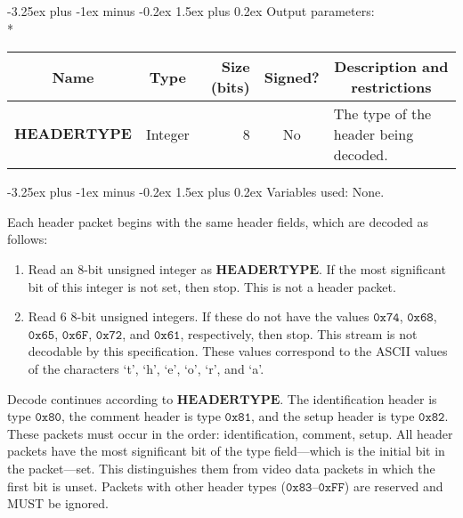 \documentclass[9pt,letterpaper]{book}
\makeatletter
\newcommand{\bitvar}[1]{\ensuremath{\mathbf{\bm{#1}}}}
\newcommand{\hex}[1]{\ensuremath{\mathtt{0x#1}}}
\numberwithin{equation}{chapter}
\numberwithin{figure}{chapter}
\numberwithin{table}{chapter}
\renewcommand{\paragraph}{\@startsection{paragraph}{4}{0ex}%
 {-3.25ex plus -1ex minus -0.2ex}%
 {1.5ex plus 0.2ex}%
 {\normalfont\normalsize\bfseries}}
\makeatother
\begin{document}
\paragraph{Output parameters:}\hfill\\*
\begin{tabularx}{\textwidth}{@{}llrcX@{}}\toprule
\multicolumn{1}{c}{Name} &
\multicolumn{1}{c}{Type} &
\multicolumn{1}{p{30pt}}{\centering Size (bits)} &
\multicolumn{1}{c}{Signed?} &
\multicolumn{1}{c}{Description and restrictions} \\\midrule\endhead
\bitvar{HEADERTYPE} & Integer & 8 & No & The type of the header being
 decoded. \\
\bottomrule\end{tabularx}

\paragraph{Variables used:} None.
\medskip

Each header packet begins with the same header fields, which are decoded as
 follows:

\begin{enumerate}
\item
Read an 8-bit unsigned integer as \bitvar{HEADERTYPE}.
If the most significant bit of this integer is not set, then stop.
This is not a header packet.
\item
Read 6 8-bit unsigned integers.
If these do not have the values \hex{74}, \hex{68}, \hex{65}, \hex{6F},
 \hex{72}, and \hex{61}, respectively, then stop.
This stream is not decodable by this specification.
These values correspond to the ASCII values of the characters `t', `h', `e',
 `o', `r', and `a'.
\end{enumerate}

Decode continues according to \bitvar{HEADERTYPE}.
The identification header is type \hex{80}, the comment header is type
 \hex{81}, and the setup header is type \hex{82}.
These packets must occur in the order: identification, comment, setup.
All header packets have the most significant bit of the type
 field---which is the initial bit in the packet---set.
This distinguishes them from video data packets in which the first bit
 is unset.
Packets with other header types (\hex{83}--\hex{FF}) are reserved and MUST be
 ignored.
\end{document}
